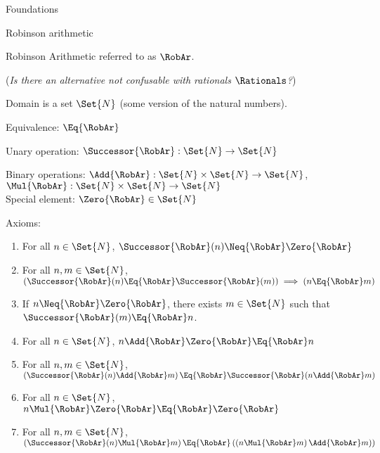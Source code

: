 \documentclass[12pt]{PalisadesLakesBook}
\begin{document}
\begin{plSection}{Foundations}
\begin{plSection}{\texorpdfstring{}{RCA0}}
  \begin{plSection}{Robinson arithmetic~\cite{wiki:RobinsonArithmetic}}

    Robinson Arithmetic referred to as $\RobAr$.

    (\TODO \textit{Is there an alternative not confusable with rationals $\Rationals$?})

    Domain is a set $\Set{N}$ (some version of the natural numbers).

    Equivalence: $\Eq{\RobAr}$

    Unary operation: $\Successor{\RobAr} : \Set{N} \rightarrow \Set{N}$

    Binary operations:
    $\Add{\RobAr} : \Set{N} \times \Set{N} \rightarrow \Set{N}$,
    $\Mul{\RobAr} : \Set{N} \times \Set{N} \rightarrow \Set{N}$\\

    Special element: $\Zero{\RobAr} \in \Set{N}$

    Axioms:
    \begin{enumerate}
      \item For all $n \in \Set{N}$,
      $\Successor{\RobAr}(n) \Neq{\RobAr} \Zero{\RobAr}$

      \item For all $n, m \in \Set{N}$,
      $\left( \Successor{\RobAr}(n) \Eq{\RobAr}
      \Successor{\RobAr}(m) \right)
      \implies \left( n \Eq{\RobAr} m \right)$

      \item If $n \Neq{\RobAr} \Zero{\RobAr}$,
      there exists $m \in \Set{N}$ such that
      $\Successor{\RobAr}(m) \Eq{\RobAr} n$.

      \item For all $n \in \Set{N}$,
      $n \Add{\RobAr} \Zero{\RobAr} \Eq{\RobAr} n$

      \item For all $n, m \in \Set{N}$,
      $\left( \Successor{\RobAr}(n) \Add{\RobAr} m \right)
      \Eq{\RobAr}
      \Successor{\RobAr}(n \Add{\RobAr} m)$

      \item For all $n \in \Set{N}$,
      $n \Mul{\RobAr} \Zero{\RobAr} \Eq{\RobAr} \Zero{\RobAr}$

      \item For all $n, m \in \Set{N}$,
      $\left( \Successor{\RobAr}(n) \Mul{\RobAr} m \right)
      \Eq{\RobAr}
      \left(
      \left( n \Mul{\RobAr} m \right)  \Add{\RobAr} m)
      \right)$

    \end{enumerate}



\end{plSection}
\end{plSection}
\end{plSection}
\end{document}
